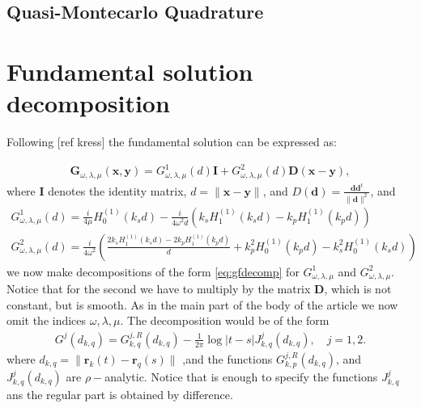 \documentclass{article}
\newcommand{\todo}[1]{{\color{red}[#1]}}
\begin{document}
\subsection{Quasi-Montecarlo Quadrature}

\appendix
\section{Fundamental solution decomposition}
\label{ap:kernelsplit}
Following \todo{ref kress} the fundamental solution can be expressed as: 

\begin{align*}
\mathbf{G}_{\omega,\lambda,  \mu}(\mathbf{x},\mathbf{y})  = G^1_{\omega,\lambda, \mu}(d) \mathbf{I} + 
{G}^2_{\omega,\lambda, \mu}(d)\mathbf{D}(\mathbf{x}-\mathbf{y}),
\end{align*}
where $\mathbf{I}$ denotes the identity matrix, $d = \| \mathbf{x} - \mathbf{y}\|$, and $D(\mathbf{d}) = \frac{\mathbf{d} \mathbf{d}^t}{\|\mathbf{d}\|^2}$, and 
\begin{align*}
G^1_{\omega,\lambda, \mu}(d) = \frac{i}{4\mu} H_{0}^{(1)}(k_s d) - \frac{i}{4\omega^2d}(k_s H_1^{(1)}(k_s d)- k_p H_1^{(1)}(k_p d)) \\
G^2_{\omega,\lambda, \mu}(d) = \frac{i}{4\omega^2} \left( 
\frac{2k_s H^{(1)}_1(k_s d)-2k_p H^{(1)}_1(k_p d)}{d}+
k_p^2H^{(1)}_0(k_p d)- k_s^2H^{(1)}_0(k_s d)  
\right)
\end{align*}
we now make decompositions of the form \eqref{eq:gfdecomp} for $G^1_{\omega,\lambda, \mu}$ and $G^2_{\omega,\lambda, \mu}$. Notice that for the second we have to multiply by the matrix $\mathbf{D}$, which is not constant, but is smooth. As in the main part of the body of the article we now omit the indices $\omega,\lambda,\mu$.  The decomposition would be of the form 
\begin{align*}
G^j(d_{k,q}) = G^{j,R}_{k,q}(d_{k,q})- \frac{1}{2\pi} \log|t-s| J^j_{k,q}(d_{k,q}), \quad j =1,2.  
\end{align*}
where $d_{k,q}= \| \mathbf{r}_k(t) -\mathbf{r}_q(s)\|$ ,and the functions  $G^{j,R}_{k,p}(d_{k,q})$, and $J^j_{k,q}(d_{k,q})$ are $\rho-$analytic. Notice that is enough to specify the functions $J^j_{k,q}$ ans the regular part is obtained by difference. 
\end{document}
